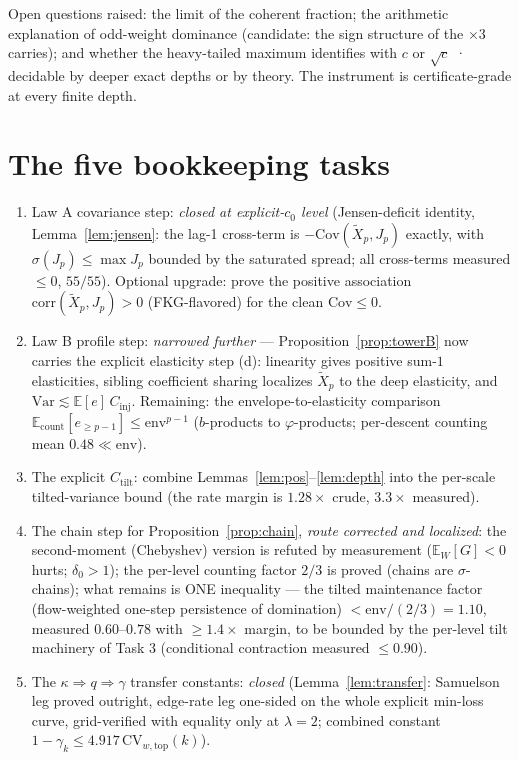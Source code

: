 \documentclass[11pt]{article}
\theoremstyle{definition}
\newcommand{\E}{\mathbb{E}}
\newcommand{\Var}{\mathrm{Var}}
\newcommand{\lam}{\lambda}
\begin{document}
Open questions raised: the limit of the coherent fraction; the arithmetic
explanation of odd-weight dominance (candidate: the sign structure of the
$\times 3$ carries); and whether the heavy-tailed maximum identifies with
$c$ or $\sqrt{c}$ · decidable by deeper exact depths or by theory. The
instrument is certificate-grade at every finite depth.

\section{The five bookkeeping tasks}

\begin{enumerate}
\item Law A covariance step: \emph{closed at explicit-$c_0$ level}
(Jensen-deficit identity, Lemma~\ref{lem:jensen}: the lag-1 cross-term is
$-\mathrm{Cov}(\tilde X_p, J_p)$ exactly, with $\sigma(J_p) \le \max J_p$
bounded by the saturated spread; all cross-terms measured $\le 0$,
$55/55$). Optional upgrade: prove the positive association
$\mathrm{corr}(\tilde X_p, J_p) > 0$ (FKG-flavored) for the clean
$\mathrm{Cov} \le 0$.
\item Law B profile step: \emph{narrowed further} ---
Proposition~\ref{prop:towerB} now carries the explicit elasticity step
(d): linearity gives positive sum-$1$ elasticities, sibling coefficient
sharing localizes $\tilde X_p$ to the deep elasticity, and
$\Var \lesssim \E[e]\,C_{\mathrm{inj}}$. Remaining: the
envelope-to-elasticity comparison
$\E_{\mathrm{count}}[e_{\ge p-1}] \le \mathrm{env}^{p-1}$
($b$-products to $\varphi$-products; per-descent counting mean $0.48
\ll \mathrm{env}$).
\item The explicit $C_{\mathrm{tilt}}$: combine
Lemmas~\ref{lem:pos}--\ref{lem:depth} into the per-scale tilted-variance bound
(the rate margin is $1.28\times$ crude, $3.3\times$ measured).
\item The chain step for Proposition~\ref{prop:chain}, \emph{route
corrected and localized}: the second-moment (Chebyshev) version is
refuted by measurement ($\E_W[G] < 0$ hurts; $\delta_0 > 1$); the
per-level counting factor $2/3$ is proved (chains are $\sigma$-chains);
what remains is ONE inequality --- the tilted maintenance factor
(flow-weighted one-step persistence of domination) $< \mathrm{env}/(2/3)
= 1.10$, measured $0.60$--$0.78$ with $\ge 1.4\times$ margin, to be
bounded by the per-level tilt machinery of Task 3 (conditional
contraction measured $\le 0.90$).
\item The $\kappa \Rightarrow q \Rightarrow \gamma$ transfer constants:
\emph{closed} (Lemma~\ref{lem:transfer}: Samuelson leg proved outright,
edge-rate leg one-sided on the whole explicit min-loss curve,
grid-verified with equality only at $\lam = 2$; combined constant
$1-\gamma_k \le 4.917\,\mathrm{CV}_{w,\mathrm{top}}(k)$).
\end{enumerate}
\end{document}
